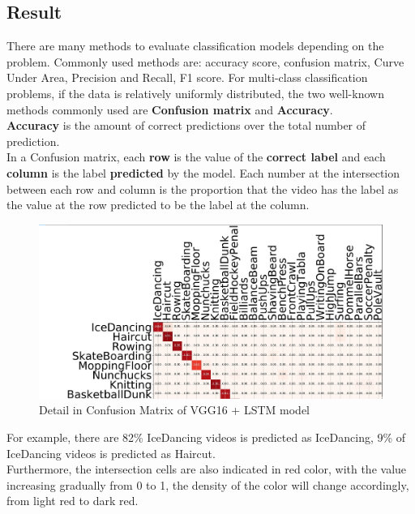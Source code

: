 \subsection{Result}
There are many methods to evaluate classification models depending on the problem. Commonly used methods are: accuracy score, confusion matrix, Curve Under Area, Precision and Recall, F1 score. For multi-class classification problems, if the data is relatively uniformly distributed, the two well-known methods commonly used are \textbf{Confusion matrix} and \textbf{Accuracy}.\\ 
\textbf{Accuracy} is the amount of correct predictions over the total number of prediction.\\
In a Confusion matrix, each \textbf{row} is the value of the \textbf{correct label} and each \textbf{column} is the label \textbf{predicted} by the model. Each number at the intersection between each row and column is the proportion that the video has the label as the value at the row predicted to be the label at the column.\\
\begin{center}
	\begin{figure}[H]
		\centering
		\includegraphics[width=1\columnwidth]{images/chap3/CFM-zoom.png}
		\caption{Detail in Confusion Matrix of VGG16 + LSTM model}
		\label{chap3:cfm-zoom}
	\end{figure}
\end{center}
\vspace{-1cm}
For example, there are 82\% IceDancing videos is predicted as IceDancing, 9\% of IceDancing videos is predicted as Haircut.\\
Furthermore, the intersection cells are also indicated in red color, with the value increasing gradually from 0 to 1, the density of the color will change accordingly, from light red to dark red.\\
